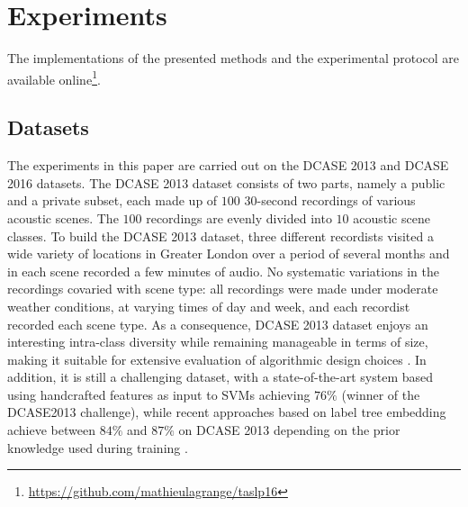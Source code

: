 \documentclass[journal]{IEEEtran}
\newcommand{\ja}[1]{\textcolor{magenta}{Joakim : #1}}
\begin{document}
\section{Experiments}
\label{sec:experiments}

The implementations of the presented methods and the experimental protocol are available online\footnote{\url{https://github.com/mathieulagrange/taslp16}}. %


\subsection{Datasets}

The experiments in this paper are carried out on the DCASE 2013 \cite{7100934} and DCASE 2016 \cite{Mesaros2016_EUSIPCO} datasets.
The DCASE 2013 dataset consists of two parts, namely a public and a private subset, each made up of $100$ $30$-second recordings of various acoustic scenes. The $100$ recordings are evenly divided into $10$ acoustic scene classes. To build the DCASE 2013 dataset, three different recordists visited a wide variety of locations in Greater London over a period of several months and in each scene recorded a few minutes of audio. No
systematic variations in the recordings covaried with scene
type: all recordings were made under moderate weather conditions, at varying times of day and week, and each recordist recorded each scene type. As a consequence, DCASE 2013 dataset enjoys an interesting intra-class diversity while remaining manageable in terms of size, making it suitable for extensive evaluation of algorithmic design choices \cite{lagrange:hal-01082501}.
In addition, it is still a challenging dataset, with a state-of-the-art system based using handcrafted features as input to SVMs achieving $76\%$ \cite{roma2013} (winner of the DCASE2013 challenge), while recent approaches based on label tree embedding achieve between $84\%$ and $87\%$ on DCASE 2013 depending on the prior knowledge used during training \cite{phan2016label}.

\end{document}
